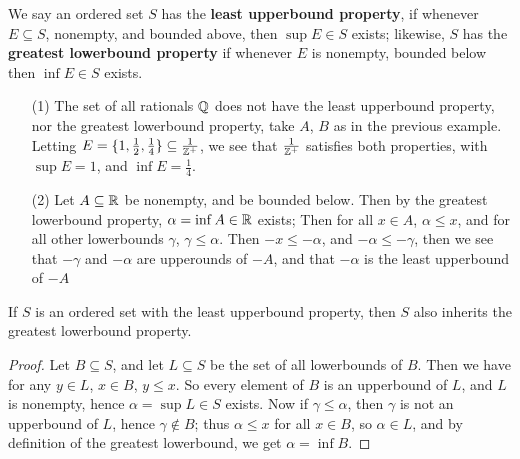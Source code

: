 \begin{definition}
    We say an ordered set $S$ has the \textbf{least upperbound property}, if whenever
    $E \subseteq S$, nonempty, and bounded above, then  $\sup{E} \in S$ exists; likewise, $S$ has
    the \textbf{greatest lowerbound property} if whenever $E$ is nonempty, bounded below
    then $\inf{E} \in S$ exists.
\end{definition}

\begin{example}
    \begin{enumerate}
        \item[(1)] The set of all rationals $\mathbb{Q}$ does not have the least upperbound property, nor the
    greatest lowerbound property, take $A$,  $B$ as in the previous example. Letting
    $E=\{1, \frac{1}{2}, \frac{1}{4}\} \subseteq \frac{1}{\mathbb{Z}^+}$, we see that $\frac{1}{\mathbb{Z}^+}$
    satisfies both properties, with $\sup{E}=1$, and  $\inf{E}=\frac{1}{4}$.

    \item[(2)] Let $A \subseteq \mathbb{R}$ be nonempty, and be bounded below. Then by the greatest
            lowerbound property,  $\alpha=\inf{A} \in \mathbb{R}$ exists; Then for all  $x \in A$,
             $\alpha \leq x$, and for all other lowerbounds  $\gamma$,  $\gamma \leq \alpha$. Then
              $-x \leq -\alpha$, and  $-\alpha \leq -\gamma$, then we see that  $-\gamma$ and  $-\alpha$
              are upperounds of  $-A$, and that  $-\alpha$ is the least upperbound of $-A$
    \end{enumerate}

\end{example}

\begin{theorem}\label{1.1.2}
    If $S$ is an ordered set with the least upperbound property, then $S$ also inherits
    the greatest lowerbound property.
\end{theorem}
\begin{proof}
    Let $B \subseteq S$, and let  $L \subseteq S$ be the set of all lowerbounds of $B$. Then we have
    for any $y \in L$, $x \in B$, $y \leq x$. So every element of  $B$ is an upperbound of  $L$, and
    $L$ is nonempty, hence $\alpha=\sup{L} \in S$ exists. Now if  $\gamma \leq \alpha$, then
     $\gamma$ is not an upperbound of  $L$, hence  $\gamma \notin B$; thus  $\alpha \leq x$ for all
      $x \in B$, so  $\alpha \in L$, and by definition of the greatest lowerbound, we get
      $\alpha=\inf{B}$.
\end{proof}
